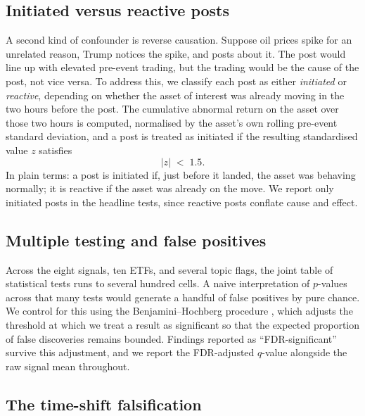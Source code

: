 \documentclass[11pt,a4paper]{article}
\begin{document}
\subsection{Initiated versus reactive posts}\label{sec:initiated}

A second kind of confounder is reverse causation. Suppose oil prices spike for an unrelated reason, Trump notices the spike, and posts about it. The post would line up with elevated pre-event trading, but the trading would be the cause of the post, not vice versa. To address this, we classify each post as either \emph{initiated} or \emph{reactive}, depending on whether the asset of interest was already moving in the two hours before the post. The cumulative abnormal return on the asset over those two hours is computed, normalised by the asset's own rolling pre-event standard deviation, and a post is treated as initiated if the resulting standardised value $z$ satisfies
\begin{equation}
\lvert z \rvert \;<\; 1.5.
\label{eq:initiated}
\end{equation}
In plain terms: a post is initiated if, just before it landed, the asset was behaving normally; it is reactive if the asset was already on the move. We report only initiated posts in the headline tests, since reactive posts conflate cause and effect.

\subsection{Multiple testing and false positives}

Across the eight signals, ten ETFs, and several topic flags, the joint table of statistical tests runs to several hundred cells. A naive interpretation of $p$-values across that many tests would generate a handful of false positives by pure chance. We control for this using the Benjamini--Hochberg procedure \citep{benjamini1995}, which adjusts the threshold at which we treat a result as significant so that the expected proportion of false discoveries remains bounded. Findings reported as ``FDR-significant'' survive this adjustment, and we report the FDR-adjusted $q$-value alongside the raw signal mean throughout.

\subsection{The time-shift falsification}
\end{document}
